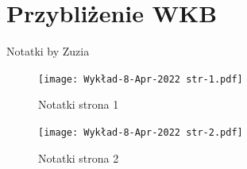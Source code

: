 \documentclass[12pt,a4paper]{report}
\newcommand{\com}[1]{{\color{red} #1}}
\newenvironment{lecture}[1]{\par\medskip
   \noindent\chapter{#1} \rmfamily}{\medskip}
\begin{document}
\begin{lecture}{Przybliżenie WKB}
\com{Notatki by Zuzia}

    \begin{figure}[!ht]
        \centering
        \texttt{[image: Wykład-8-Apr-2022 str-1.pdf]}
        \caption{Notatki strona 1}
        \label{fig:lec_12:not_str_1}
    \end{figure}
    
    \begin{figure}[!ht]
        \centering
        \texttt{[image: Wykład-8-Apr-2022 str-2.pdf]}
        \caption{Notatki strona 2}
        \label{fig:lec_12:not_str_2}
    \end{figure}

\end{lecture}

\end{document}
